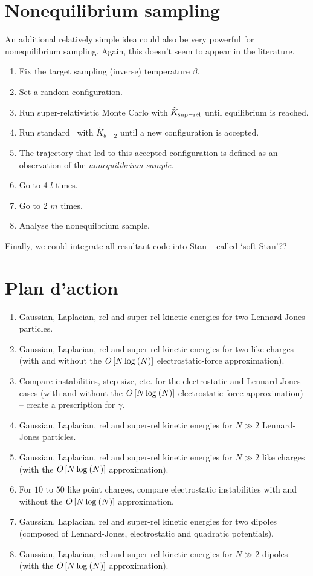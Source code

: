\documentclass[a4paper]{article}
\begin{document}
\section{Nonequilibrium sampling}

An additional relatively simple idea could also be very powerful for nonequilibrium sampling. Again, this doesn't seem to appear in the literature. 

\begin{enumerate}
\item Fix the target sampling (inverse) temperature $\beta$.
\item Set a random configuration.
\item Run super-relativistic Monte Carlo with $\tilde{K}_{\rm sup-rel}$ until equilibrium is reached. 
\item Run standard \HMC\ with $\tilde{K}_{b = 2}$ until a new configuration is accepted.
\item The trajectory that led to this accepted configuration is defined as an observation of the \emph{nonequilibrium sample}.
\item Go to 4 $l$ times.
\item Go to 2 $m$ times.
\item Analyse the nonequilbrium sample.
\end{enumerate}

Finally, we could integrate all resultant code into Stan --  called `soft-Stan'??


\section{Plan d'action}

\begin{enumerate}
\item Gaussian, Laplacian, rel and super-rel kinetic energies for two Lennard-Jones particles. 
\item Gaussian, Laplacian, rel and super-rel kinetic energies for two like charges (with and without the $O\left[ N \log^{} \left( N \right) \right]$ electrostatic-force approximation). 
\item Compare instabilities, step size, etc. for the electrostatic and Lennard-Jones cases (with and without the $O\left[ N \log^{} \left( N \right) \right]$ electrostatic-force approximation) -- create a prescription for $\gamma$. 
\item Gaussian, Laplacian, rel and super-rel kinetic energies for $N \gg 2$ Lennard-Jones particles. 
\item Gaussian, Laplacian, rel and super-rel kinetic energies for $N \gg 2$ like charges (with the $O\left[ N \log^{} \left( N \right) \right]$ approximation). 
\item For $10$ to $50$ like point charges, compare electrostatic instabilities with and without the $O\left[ N \log^{} \left( N \right) \right]$ approximation. 
\item Gaussian, Laplacian, rel and super-rel kinetic energies for two dipoles (composed of Lennard-Jones, electrostatic and quadratic potentials). 
\item Gaussian, Laplacian, rel and super-rel kinetic energies for $N \gg 2$ dipoles (with the $O\left[ N \log^{} \left( N \right) \right]$ approximation). 
\end{enumerate}



\end{document}
